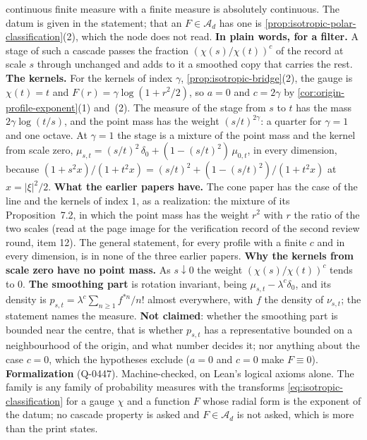 \begin{proposition}
{continuous finite measure with a finite measure is absolutely continuous. The datum is given in
the statement; that an $F \in \mathcal{A}_d$ has one is
\ref{prop:isotropic-polar-classification}(2), which the node does not read. \textbf{In plain
words, for a filter.} A stage of such a cascade passes the fraction $(\chi(s)/\chi(t))^c$ of the
record at scale $s$ through unchanged and adds to it a smoothed copy that carries the rest.
\textbf{The \Matern{} kernels.} For the \Matern{} kernels of index $\gamma$,
\ref{prop:isotropic-bridge}(2), the gauge is $\chi(t) = t$ and $F(r) = \gamma\log(1 + r^2/2)$, so
$a = 0$ and $c = 2\gamma$ by \ref{cor:origin-profile-exponent}(1) and~(2). The \Levy{} measure
of the stage from $s$ to $t$ has the mass $2\gamma\log(t/s)$, and the point mass has the weight
$(s/t)^{2\gamma}$: a quarter for $\gamma = 1$ and one octave. At $\gamma = 1$ the stage is a
mixture of the point mass and the kernel from scale zero,
$\mu_{s,t} = (s/t)^2\,\delta_0 + (1 - (s/t)^2)\,\mu_{0,t}$, in every dimension, because
$(1 + s^2x)/(1 + t^2x) = (s/t)^2 + (1 - (s/t)^2)/(1 + t^2x)$ at $x = |\xi|^2/2$.
\textbf{What the earlier papers have.} The cone paper has the case of the line and the
\Matern{} kernels of index $1$, as a realization: the mixture  of its
Proposition~7.2, in which the point mass has the weight $r^2$ with $r$ the ratio of the two
scales (read at the page image for the verification record of the second review round, item
12). The general statement, for every profile with a finite $c$ and in every dimension, is in
none of the three earlier papers. \textbf{Why the kernels from scale zero have no point mass.}
As $s \downarrow 0$ the weight $(\chi(s)/\chi(t))^c$ tends to $0$. \textbf{The smoothing part}
is rotation invariant, being $\mu_{s,t} - \lambda^c\delta_0$, and its density is
$p_{s,t} = \lambda^c\sum_{n \ge 1}f^{*n}/n!$ almost everywhere, with $f$ the density of
$\nu_{s,t}$; the statement names the measure. \textbf{Not claimed}: whether the smoothing part
is bounded near the centre, that is whether $p_{s,t}$ has a representative bounded on a
neighbourhood of the origin, and what number decides it; nor anything about the case $c = 0$,
which the hypotheses exclude ($a = 0$ and $c = 0$ make $F \equiv 0$). \textbf{Formalization}
(Q-0447). Machine-checked, on Lean's logical axioms alone. The family is any
family of probability measures with the transforms \ref{eq:isotropic-classification} for a
gauge $\chi$ and a function $F$ whose radial form is the exponent of the datum; no cascade
property is asked and $F \in \mathcal{A}_d$ is not asked, which is more than the print states.
}
\end{proposition}
